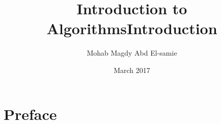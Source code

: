 \documentclass[a4paper,12pt]{book}
\begin{document}
\author{Mohab Magdy Abd El-samie}
\title{Introduction to Algorithms}
\date{March 2017}

\frontmatter
\maketitle
\title{\textbf{Introduction}}
\chapter*{Preface}

\tableofcontents
\mainmatter



\backmatter
\end{document}
